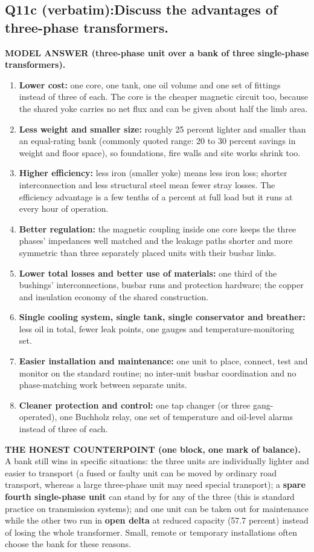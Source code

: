 \documentclass[11pt]{article}
\newcommand{\qhead}[2]{\subsection*{\color{copper}#1\quad\color{iron}#2}}
\newcommand{\tagline}[1]{\textbf{\color{copper}#1}}
\begin{document}
\qhead{Q11c (verbatim):}{Discuss the advantages of three-phase transformers.}

\tagline{MODEL ANSWER (three-phase unit over a bank of three single-phase transformers).}
\begin{enumerate}[label=\arabic*.]
\item \textbf{Lower cost:} one core, one tank, one oil volume and one set of fittings instead of three of each. The core is the cheaper magnetic circuit too, because the shared yoke carries no net flux and can be given about half the limb area.
\item \textbf{Less weight and smaller size:} roughly 25 percent lighter and smaller than an equal-rating bank (commonly quoted range: 20 to 30 percent savings in weight and floor space), so foundations, fire walls and site works shrink too.
\item \textbf{Higher efficiency:} less iron (smaller yoke) means less iron loss; shorter interconnection and less structural steel mean fewer stray losses. The efficiency advantage is a few tenths of a percent at full load but it runs at every hour of operation.
\item \textbf{Better regulation:} the magnetic coupling inside one core keeps the three phases' impedances well matched and the leakage paths shorter and more symmetric than three separately placed units with their busbar links.
\item \textbf{Lower total losses and better use of materials:} one third of the bushings' interconnections, busbar runs and protection hardware; the copper and insulation economy of the shared construction.
\item \textbf{Single cooling system, single tank, single conservator and breather:} less oil in total, fewer leak points, one gauges and temperature-monitoring set.
\item \textbf{Easier installation and maintenance:} one unit to place, connect, test and monitor on the standard routine; no inter-unit busbar coordination and no phase-matching work between separate units.
\item \textbf{Cleaner protection and control:} one tap changer (or three gang-operated), one Buchholz relay, one set of temperature and oil-level alarms instead of three of each.
\end{enumerate}

\tagline{THE HONEST COUNTERPOINT (one block, one mark of balance).} A bank still wins in specific situations: the three units are individually lighter and easier to transport (a fused or faulty unit can be moved by ordinary road transport, whereas a large three-phase unit may need special transport); a \textbf{spare fourth single-phase unit} can stand by for any of the three (this is standard practice on transmission systems); and one unit can be taken out for maintenance while the other two run in \textbf{open delta} at reduced capacity (57.7 percent) instead of losing the whole transformer. Small, remote or temporary installations often choose the bank for these reasons.
\end{document}
